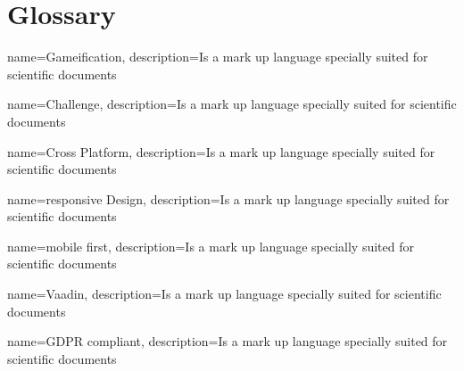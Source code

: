 \chapter{Glossary}

{
    name=Gameification,
    description={Is a mark up language specially suited
    for scientific documents}
}


{
    name=Challenge,
    description={Is a mark up language specially suited
    for scientific documents}
}


{
    name=Cross Platform,
    description={Is a mark up language specially suited
    for scientific documents}
}


{
    name=responsive Design,
    description={Is a mark up language specially suited
    for scientific documents}
}


{
    name=mobile first,
    description={Is a mark up language specially suited
    for scientific documents}
}


{
    name=Vaadin,
    description={Is a mark up language specially suited
    for scientific documents}
}


{
    name=GDPR compliant,
    description={Is a mark up language specially suited
    for scientific documents}
}


\printglossaries
